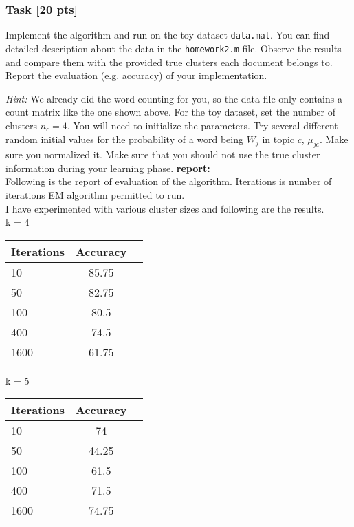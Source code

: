 \documentclass[twoside,10pt]{article}
\begin{document}
\subsubsection*{Task [20
pts]}

Implement the algorithm and run on the toy dataset \texttt{data.mat}. You
can find detailed description about the data in the
\texttt{homework2.m} file. Observe the results and compare them with
the provided true clusters each document belongs to. Report the
evaluation (e.g. accuracy) of your implementation.

\emph{Hint:} We already did the word counting for you, so the data
file only contains a count matrix like the one shown above. For the toy dataset, set the
number of clusters $n_c = 4$. You will need to initialize the
parameters. Try several different random initial values for the
probability of a word being $W_j$ in topic $c$, $\mu_{jc}$. Make
sure you normalized it. Make sure that you should not use the true
cluster information during your learning phase.\newline
\textbf{report:}\\

Following is the report of evaluation of the algorithm. Iterations is number of iterations EM algorithm permitted to run.\\
I have experimented with various cluster sizes and following are the results.\\


k = 4\\
\begin{table}[!h]
\centering \small
\begin{tabular}{l|c|c}
  \hline
  Iterations & Accuracy \\
  \hline \hline
  10 & 85.75\\
  50 & 82.75\\
  100 & 80.5\\
  400 & 74.5\\
  1600 & 61.75\\
  \hline
\end{tabular}
\end{table}

k = 5\\
\begin{table}[!h]
\centering \small
\begin{tabular}{l|c|c}
  \hline
  Iterations & Accuracy \\
  \hline \hline
  10 & 74\\
  50 & 44.25\\
  100 & 61.5\\
  400 & 71.5\\
  1600 & 74.75\\
  \hline
\end{tabular}
\end{table}
\end{document}
